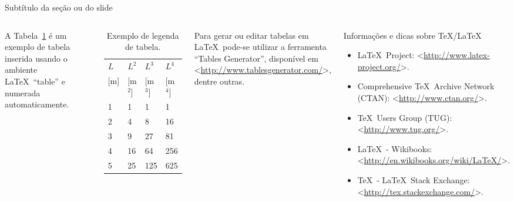 \documentclass[%
  10pt,%
  aspectratio = 169,%
  compress,%
  t,%
]{beamer}%
\begin{document}
\begin{frame}{}{Subtítulo da seção ou do slide}
\begin{columns}[t]
A Tabela~\ref{tab:Ldimensoes} é um exemplo de tabela inserida usando o ambiente \LaTeX\ ``table'' e numerada automaticamente.
\begin{table}[!htb]
\centering
{}%
\caption{Exemplo de legenda de tabela.}
\label{tab:Ldimensoes}
\begin{tabular*}{\columnwidth}{@{\extracolsep{\fill}}llll}
\hline
$L$   & $L^2$     & $L^3$     & $L^4$     \\
{[m]} & {[m$^2$]} & {[m$^3$]} & {[m$^4$]} \\ \hline
1     & 1         & 1         & 1         \\
2     & 4         & 8         & 16        \\
3     & 9         & 27        & 81        \\
4     & 16        & 64        & 256       \\
5     & 25        & 125       & 625       \\ \hline
\end{tabular*}
\end{table}
Para gerar ou editar tabelas em \LaTeX\ pode-se utilizar a ferramenta ``Tables Generator'', disponível em <\url{http://www.tablesgenerator.com/}>, dentre outras.
\begin{block}{Informações e dicas sobre \TeX/\LaTeX}
\begin{itemize}
\item \LaTeX\ Project: <\url{http://www.latex-project.org/}>.
\item Comprehensive \TeX\ Archive Network (CTAN): <\url{http://www.ctan.org/}>.
\item \TeX\ Users Group (TUG): <\url{http://www.tug.org/}>.
\item \LaTeX\ - Wikibooks: <\url{http://en.wikibooks.org/wiki/LaTeX/}>.
\item \TeX\ - \LaTeX\ Stack Exchange: <\url{http://tex.stackexchange.com/}>.
\end{itemize}
\end{block}
\end{columns}
\end{frame}
\end{document}
